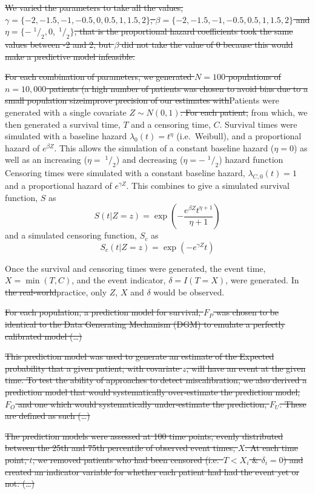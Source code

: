 \documentclass[
]{article}
\newcommand{\sfrac}[2]{\;^{#1}/_{#2}}
\begin{document}
\sout{We varied the parameters to take all the values,\(\gamma = \{-2,-1.5,-1,-0.5,0,0.5,1,1.5,2\}\), \(\beta = \{-2,-1.5,-1,-0.5,0.5,1,1.5,2\}\) and \(\eta = \{-\sfrac{1}{2},0,\sfrac{1}{2}\}\), that is the proportional hazard coefficients took the same values between -2 and 2, but \(\beta\) did not take the value of 0 because this would make a predictive model infeasible.}

\sout{For each combination of parameters, we generated \(N = 100\) populations of \(n = 10,000\) patients (a high number of patients was chosen to avoid bias due to a small population sizeimprove precision of our estimates with}Patients were generated with a single covariate \(Z \sim N(0,1)\)\sout{. For each patient,} from which, we then generated a survival time, \(T\) and a censoring time, \(C\). Survival times were simulated with a baseline hazard \(\lambda_0(t) = t^{\eta}\) (i.e.~Weibull), and a proportional hazard of \(e^{\beta Z}\). This allows the simulation of a constant baseline hazard (\(\eta = 0\)) as well as an increasing (\(\eta = \sfrac{1}{2}\)) and decreasing (\(\eta = -\sfrac{1}{2}\)) hazard function Censoring times were simulated with a constant baseline hazard, \(\lambda_{C,0}(t) = 1\) and a proportional hazard of \(e^{\gamma Z}\). This combines to give a simulated survival function, \(S\) as
\[
S(t|Z=z) = \exp\left(-\frac{e^{\beta Z}t^{\eta+1}}{\eta+1}\right)
\]
and a simulated censoring function, \(S_c\) as
\[
S_c(t|Z=z) = \exp\left(-e^{\gamma Z}t\right)
\]

Once the survival and censoring times were generated, the event time, \(X = \min(T,C)\), and the event indicator, \(\delta = I(T=X)\), were generated. In \sout{the real-world}practice, only \(Z\), \(X\) and \(\delta\) would be observed.

\sout{For each population, a prediction model for survival, \(F_P\) was chosen to be identical to the Data Generating Mechanism (DGM) to emulate a perfectly calibrated model (\ldots)}

\sout{This prediction model was used to generate an estimate of the Expected probability that a given patient, with covariate \(z\), will have an event at the given time. To test the ability of approaches to detect miscalibration, we also derived a prediction model that would systematically over-estimate the prediction model, \(F_O\) and one which would systematically under-estimate the prediction, \(F_U\). These are defined as such (\ldots)}

\sout{The prediction models were assessed at 100 time points, evenly distributed between the 25th and 75th percentile of observed event times, \(X\). At each time point, \(t\), we removed patients who had been censored (i.e.~\(T < X_i\) \& \(\delta_i = 0\)) and created an indicator variable for whether each patient had had the event yet or not: (\ldots)}
\end{document}

